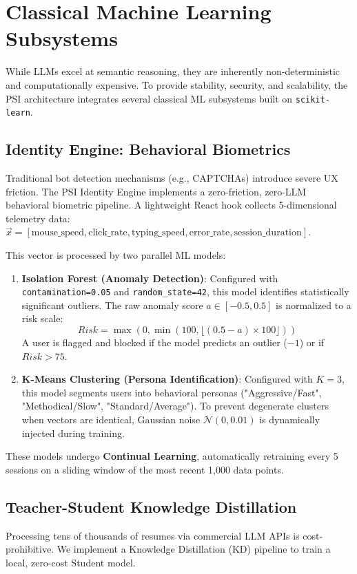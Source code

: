 \section{Classical Machine Learning Subsystems}\label{sec:classical_ml}

While LLMs excel at semantic reasoning, they are inherently non-deterministic and computationally expensive. To provide stability, security, and scalability, the PSI architecture integrates several classical ML subsystems built on \texttt{scikit-learn}.

\subsection{Identity Engine: Behavioral Biometrics}
Traditional bot detection mechanisms (e.g., CAPTCHAs) introduce severe UX friction. The PSI Identity Engine implements a zero-friction, zero-LLM behavioral biometric pipeline. 
A lightweight React hook collects 5-dimensional telemetry data: $\vec{x} = [\text{mouse\_speed}, \text{click\_rate}, \text{typing\_speed}, \text{error\_rate}, \text{session\_duration}]$.

This vector is processed by two parallel ML models:
\begin{enumerate}
    \item \textbf{Isolation Forest (Anomaly Detection)}: Configured with \texttt{contamination=0.05} and \texttt{random\_state=42}, this model identifies statistically significant outliers. The raw anomaly score $a \in [-0.5, 0.5]$ is normalized to a risk scale:
    \begin{equation}
        Risk = \max(0, \min(100, \lfloor (0.5 - a) \times 100 \rfloor))
    \end{equation}
    A user is flagged and blocked if the model predicts an outlier ($-1$) or if $Risk > 75$.
    \item \textbf{K-Means Clustering (Persona Identification)}: Configured with $K=3$, this model segments users into behavioral personas ("Aggressive/Fast", "Methodical/Slow", "Standard/Average"). To prevent degenerate clusters when vectors are identical, Gaussian noise $\mathcal{N}(0, 0.01)$ is dynamically injected during training.
\end{enumerate}
These models undergo \textbf{Continual Learning}, automatically retraining every 5 sessions on a sliding window of the most recent 1,000 data points.

\subsection{Teacher-Student Knowledge Distillation}
Processing tens of thousands of resumes via commercial LLM APIs is cost-prohibitive. We implement a Knowledge Distillation (KD) pipeline to train a local, zero-cost Student model.

